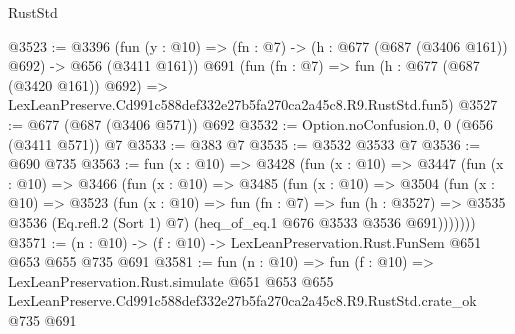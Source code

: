 \begin{lexlean}{RustStd}
\begin{coremodule}
@3523 := @3396
    (fun (y : @10) => (fn : @7) -> (h : @677 (@687 (@3406 @161)) @692) -> @656 (@3411 @161))
    @691
    (fun (fn : @7) =>
    fun (h : @677 (@687 (@3420 @161)) @692) =>
    LexLeanPreserve.Cd991c588def332e27b5fa270ca2a45c8.R9.RustStd.fun5)
@3527 := @677 (@687 (@3406 @571)) @692
@3532 := Option.noConfusion.{0, 0} (@656 (@3411 @571)) @7
@3533 := @383 @7
@3535 := @3532 @3533 @7
@3536 := @690 @735
@3563 := fun (x : @10) =>
  @3428
    (fun (x : @10) =>
    @3447
      (fun (x : @10) =>
      @3466
        (fun (x : @10) =>
        @3485
          (fun (x : @10) =>
          @3504
            (fun (x : @10) =>
            @3523
              (fun (x : @10) =>
              fun (fn : @7) =>
              fun (h : @3527) =>
              @3535 @3536 (Eq.refl.{2} (Sort 1) @7) (heq_of_eq.{1} @676 @3533 @3536 @691)))))))
@3571 := (n : @10) -> (f : @10) -> LexLeanPreservation.Rust.FunSem @651 @653 @655 @735 @691
@3581 := fun (n : @10) =>
  fun (f : @10) =>
  LexLeanPreservation.Rust.simulate
    @651
    @653
    @655
    LexLeanPreserve.Cd991c588def332e27b5fa270ca2a45c8.R9.RustStd.crate_ok
    @735
    @691
\end{coremodule}
\end{lexlean}
